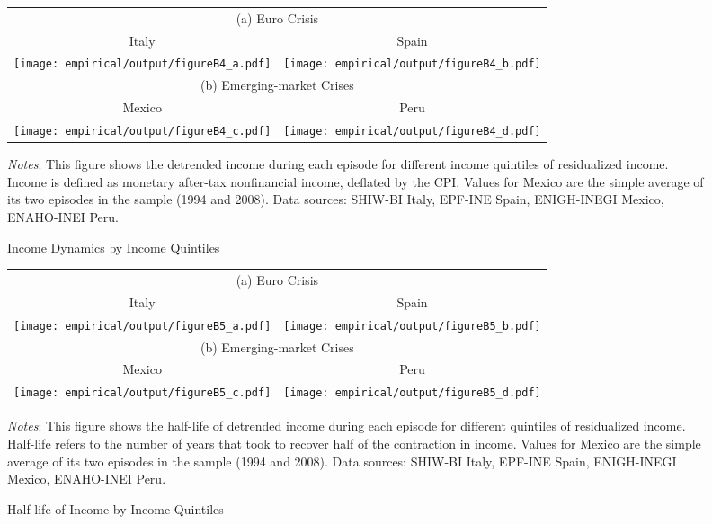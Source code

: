 \documentclass[12pt]{article}
\begin{document}
\begin{spacing}{1.5}
\begin{figure}[H]
\begin{tabular}{cc}
\multicolumn{2}{c}{(a) Euro Crisis} \vspace{.4em}  \\
{\small{}{Italy} } & {\small{}{Spain} } \tabularnewline
\texttt{[image: empirical/output/figureB4\_a.pdf]} &
\texttt{[image: empirical/output/figureB4\_b.pdf]}  \\
\multicolumn{2}{c}{(b) Emerging-market Crises} \vspace{.4em} \\
{\small{}{Mexico} } & {\small{}{Peru} }\tabularnewline
\texttt{[image: empirical/output/figureB4\_c.pdf]} &
\texttt{[image: empirical/output/figureB4\_d.pdf]}  \\
\end{tabular}\caption{Income Dynamics by Income Quintiles
\label{fig_Y_dynamics}}
\medskip{}
\raggedright{}\textit{\footnotesize{}Notes}{\footnotesize{}: This figure shows the detrended income during each episode for different income quintiles of residualized income. Income is defined as monetary after-tax nonfinancial income, deflated by the CPI. Values for Mexico are the simple average of its two episodes in the sample (1994 and 2008). Data sources: SHIW-BI Italy, EPF-INE Spain, ENIGH-INEGI Mexico, ENAHO-INEI Peru.}{\footnotesize\par}
\end{figure}

\begin{spacing}{1}
\begin{figure}[H]
	\begin{tabular}{cc}
		\multicolumn{2}{c}{(a) Euro Crisis} \vspace{.4em}  \\
		{\small{}{Italy} } & {\small{}{Spain} } \tabularnewline
		\texttt{[image: empirical/output/figureB5\_a.pdf]} &
		\texttt{[image: empirical/output/figureB5\_b.pdf]} \\
		\multicolumn{2}{c}{(b) Emerging-market Crises} \vspace{.4em} \\
		{\small{}{Mexico} } & {\small{}{Peru} }\tabularnewline
		\texttt{[image: empirical/output/figureB5\_c.pdf]} &
		\texttt{[image: empirical/output/figureB5\_d.pdf]} \\
	\end{tabular}\caption{Half-life of Income by Income Quintiles
		\label{fig_halflife}}
	\medskip{}
	\raggedright{}\textit{\footnotesize{}Notes}{\footnotesize{}: This figure shows the half-life of detrended income during each episode for different quintiles of residualized income. Half-life refers to the number of years that took to recover half of the contraction in income. Values for Mexico are the simple average of its two episodes in the sample (1994 and 2008). Data sources: SHIW-BI Italy, EPF-INE Spain, ENIGH-INEGI Mexico, ENAHO-INEI Peru.}{\footnotesize\par}
\end{figure}
\end{spacing}


\end{spacing}
\end{document}
